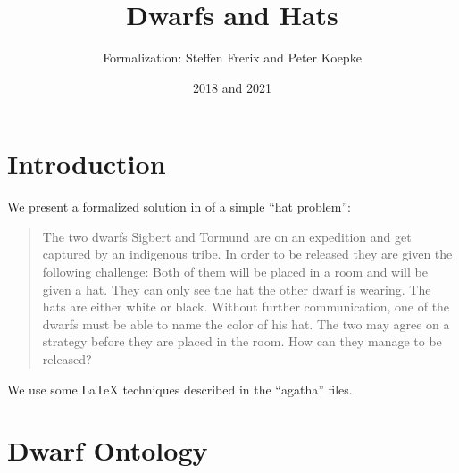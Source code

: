 \documentclass{article}
\title{Dwarfs and Hats}
\author{\Naproche Formalization: Steffen Frerix and Peter Koepke}
\date{2018 and 2021}
\begin{document}

\maketitle

\section{Introduction}

We present a formalized solution in \Naproche of a simple ``hat problem'':

\begin{quotation}
The two dwarfs Sigbert and Tormund are on an expedition and get captured
by an indigenous tribe. In order to be released they are given the following
challenge: Both of them will be placed in a room and will be given a hat. They
can only see the hat the other dwarf is wearing. The hats are either white or black.
Without further communication, one of the dwarfs must be able to name the color of
his hat.
The two may agree on a strategy before they are placed in the room. How can they manage
to be released?
\end{quotation}

We use some \LaTeX{} techniques described in the “agatha” files.


\section{Dwarf Ontology}

\begin{forthel}
\end{forthel}
\end{document}
